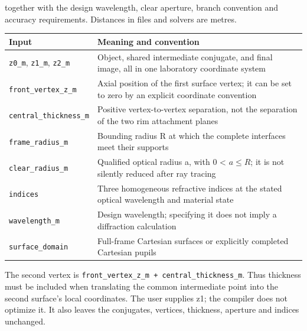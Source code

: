 together with the design wavelength, clear aperture, branch convention
and accuracy requirements. Distances in files and solvers are metres.

{\def\LTcaptype{none} %
\begin{longtable}[]{@{}
  >{\raggedright\arraybackslash}p{}
  >{\raggedright\arraybackslash}p{}@{}}
\toprule\noalign{}
\begin{minipage}[b]{\linewidth}\raggedright
Input
\end{minipage} & \begin{minipage}[b]{\linewidth}\raggedright
Meaning and convention
\end{minipage} \\
\midrule\noalign{}
\endhead
\bottomrule\noalign{}
\endlastfoot
\texttt{z0\_m}, \texttt{z1\_m}, \texttt{z2\_m} & Object, shared
intermediate conjugate, and final image, all in one laboratory
coordinate system \\
\texttt{front\_vertex\_z\_m} & Axial position of the first surface
vertex; it can be set to zero by an explicit coordinate convention \\
\texttt{central\_thickness\_m} & Positive vertex-to-vertex separation,
not the separation of the two rim attachment planes \\
\texttt{frame\_radius\_m} & Bounding radius R at which the complete
interfaces meet their supports \\
\texttt{clear\_radius\_m} & Qualified optical radius a, with 0
\textless{} $a\le R$; it is not silently reduced after ray tracing \\
\texttt{indices} & Three homogeneous refractive indices at the stated
optical wavelength and material state \\
\texttt{wavelength\_m} & Design wavelength; specifying it does not imply
a diffraction calculation \\
\texttt{surface\_domain} & Full-frame Cartesian surfaces or explicitly
completed Cartesian pupils \\
\end{longtable}
}

The second vertex is
\texttt{front\_vertex\_z\_m\ +\ central\_thickness\_m}. Thus thickness
must be included when translating the common intermediate point into the
second surface's local coordinates. The user supplies z1; the compiler
does not optimize it. It also leaves the conjugates, vertices,
thickness, aperture and indices unchanged.

